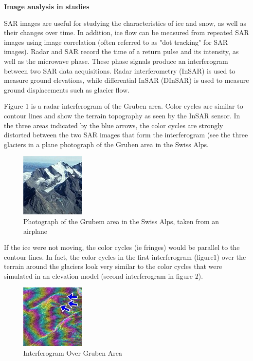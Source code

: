 \documentclass[a4paper,12pt]{report}
\begin{document}
\begin{flushleft}
\textbf{Image analysis in studies}
\end{flushleft}
SAR images are useful for studying the characteristics of ice and snow, as well as their changes over time. In addition, ice flow can be measured from repeated SAR images using image correlation (often referred to as "dot tracking" for SAR images).
Radar and SAR record the time of a return pulse and its intensity, as well as the microwave phase. These phase signals produce an interferogram between two SAR data acquisitions. Radar interferometry (InSAR) is used to measure ground elevations, while differential InSAR (DInSAR) is used to measure ground displacements such as glacier flow.$$$$

Figure 1 is a radar interferogram of the Gruben area. Color cycles are similar to contour lines and show the terrain topography as seen by the InSAR sensor. In the three areas indicated by the blue arrows, the color cycles are strongly distorted between the two SAR images that form the interferogram (see the three glaciers in a plane photograph of the Gruben area in the Swiss Alps.

	\begin{figure}[H]
	\begin{center}
	\includegraphics[scale=1]{fig1}
	\caption{Photograph of the Grubem area in the Swiss Alps, taken from an airplane}
	\end{center}
	\end{figure}
	
If the ice were not moving, the color cycles (ie fringes) would be parallel to the contour lines. In fact, the color cycles in the first interferogram (figure1) over the terrain around the glaciers look very similar to the color cycles that were simulated in an elevation model (second interferogram in figure 2).

	\begin{figure}[H]
	\begin{center}
	\includegraphics[scale=1]{fig2}
	\caption{Interferogram Over Gruben Area}
	\end{center}
	\end{figure}
	
\end{document}
